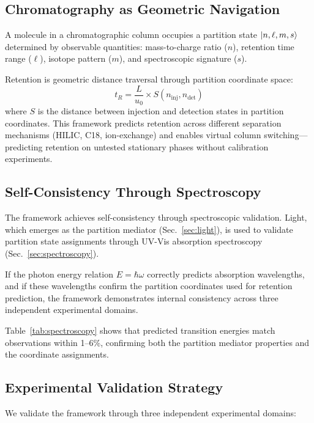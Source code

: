 \documentclass[twocolumn,superscriptaddress,prb,10pt]{revtex4-2}
\begin{document}
\subsection{Chromatography as Geometric Navigation}

A molecule in a chromatographic column occupies a partition state $\ket{n,\ell,m,s}$ determined by observable quantities: mass-to-charge ratio ($n$), retention time range ($\ell$), isotope pattern ($m$), and spectroscopic signature ($s$).

Retention is geometric distance traversal through partition coordinate space:
\begin{equation}
t_R = \frac{L}{u_0} \times S(n_{\text{inj}}, n_{\text{det}})
\label{eq:retention_intro}
\end{equation}
where $S$ is the distance between injection and detection states in partition coordinates. This framework predicts retention across different separation mechanisms (HILIC, C18, ion-exchange) and enables virtual column switching—predicting retention on untested stationary phases without calibration experiments.

\subsection{Self-Consistency Through Spectroscopy}

The framework achieves self-consistency through spectroscopic validation. Light, which emerges as the partition mediator (Sec.~\ref{sec:light}), is used to validate partition state assignments through UV-Vis absorption spectroscopy (Sec.~\ref{sec:spectroscopy}). 

If the photon energy relation $E = \hbar\omega$ correctly predicts absorption wavelengths, and if these wavelengths confirm the partition coordinates used for retention prediction, the framework demonstrates internal consistency across three independent experimental domains.

Table~\ref{tab:spectroscopy} shows that predicted transition energies match observations within 1--6\%, confirming both the partition mediator properties and the coordinate assignments.

\subsection{Experimental Validation Strategy}

We validate the framework through three independent experimental domains:
\end{document}
